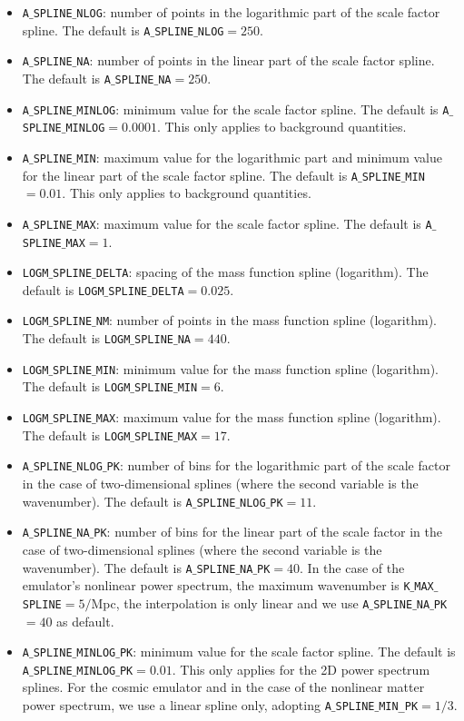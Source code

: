 \documentclass[\docopts]{\docclass}
\begin{document}
\begin{itemize}
\item {\tt A$\_$SPLINE$\_$NLOG}: number of points in the logarithmic part of the scale factor spline. The default is {\tt A$\_$SPLINE$\_$NLOG}$=250$.
\item {\tt A$\_$SPLINE$\_$NA}: number of points in the linear part of the scale factor spline. The default is {\tt A$\_$SPLINE$\_$NA}$=250$.
\item {\tt A$\_$SPLINE$\_$MINLOG}: minimum value for the scale factor spline. The default is {\tt A$\_$SPLINE$\_$MINLOG}$=0.0001$. This only applies to background quantities.
\item {\tt A$\_$SPLINE$\_$MIN}: maximum value for the logarithmic part and minimum value for the linear part of the scale factor spline. The default is {\tt A$\_$SPLINE$\_$MIN}$=0.01$. This only applies to background quantities.
\item {\tt A$\_$SPLINE$\_$MAX}: maximum value for the scale factor spline. The default is {\tt A$\_$SPLINE$\_$MAX}$=1$.
\item {\tt LOGM$\_$SPLINE$\_$DELTA}: spacing of the mass function spline (logarithm). The default is {\tt LOGM$\_$SPLINE$\_$DELTA}$=0.025$.
\item {\tt LOGM$\_$SPLINE$\_$NM}: number of points in the mass function spline (logarithm). The default is {\tt LOGM$\_$SPLINE$\_$NA}$=440$.
\item {\tt LOGM$\_$SPLINE$\_$MIN}: minimum value for the mass function spline (logarithm). The default is {\tt LOGM$\_$SPLINE$\_$MIN}$=6$.
\item {\tt LOGM$\_$SPLINE$\_$MAX}: maximum value for the mass function spline (logarithm). The default is {\tt LOGM$\_$SPLINE$\_$MAX}$=17$.
\item {\tt A$\_$SPLINE$\_$NLOG$\_$PK}: number of bins for the logarithmic part of the scale factor in the case of two-dimensional splines (where the second variable is the wavenumber). The default is {\tt A$\_$SPLINE$\_$NLOG$\_$PK}$=11$.
\item {\tt A$\_$SPLINE$\_$NA$\_$PK}: number of bins for the linear part of the scale factor in the case of two-dimensional splines (where the second variable is the wavenumber). The default is {\tt A$\_$SPLINE$\_$NA$\_$PK}$=40$. In the case of the emulator's nonlinear power spectrum, the maximum wavenumber is {\tt K$\_$MAX$\_$SPLINE}$=5/$Mpc, the interpolation is only linear and we use {\tt A$\_$SPLINE$\_$NA$\_$PK}$=40$ as default.
\item {\tt A$\_$SPLINE$\_$MINLOG$\_$PK}: minimum value for the scale factor spline. The default is {\tt A$\_$SPLINE$\_$MINLOG$\_$PK}$=0.01$. This only applies for the 2D power spectrum splines. For the cosmic emulator and in the case of the nonlinear matter power spectrum, we use a linear spline only, adopting {\tt A$\_$SPLINE$\_$MIN\_PK}$=1/3$.

\end{itemize}
\end{document}
